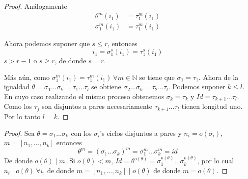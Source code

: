 \begin{proof}
    Análogamente
    \begin{equation*}
    \begin{aligned}
        \theta^m(i_1) &= \tau_1^m(i_1) \\
        \sigma_1^m(i_1) &= \tau_1^m(i_1)
    \end{aligned}
    \end{equation*}
    
    Ahora podemos suponer que $s \leq r$, entonces
    \begin{equation*}
        i_1 = \sigma_1^s(i_1) = \tau_1^s(i_1)
    \end{equation*}
    $s > r-1$ o $s \geq r$, de donde $s=r$.
    
    Más aún, como $\sigma_1^m(i_1) = \tau_1^m(i_1) \ \forall m \in \mathbb{N}$ se tiene que $\sigma_1 = \tau_1$.
    Ahora de la igualdad $\theta = \sigma_1 \dots \sigma_k = \tau_1 \dots \tau_l$ se obtiene $\sigma_2 \dots \sigma_k = \tau_2 \dots \tau_l$.
    Podemos suponer $k \leq l$. En cuyo caso realizando el mismo proceso obtenemos
    $\sigma_k = \tau_k$ y $Id = \tau_{k+1} \dots \tau_l$.
    Como los $\tau_j$ son disjuntos a pares necesariamente $\tau_{k+1} \dots \tau_l$ tienen longitud uno. Por lo tanto $l=k$.
\end{proof}


\begin{proof}
    Sea $\theta = \sigma_1 \dots \sigma_k$ con los $\sigma_i$'s ciclos disjuntos a pares y $n_i = o(\sigma_i)$, 
    $m = [n_1, \dots, n_k]$ entonces
    \begin{equation*}
        \theta^m = (\sigma_1 \dots \sigma_k)^m = \sigma_1^m \dots \sigma_k^m = id
    \end{equation*}
    De donde $o(\theta) \mid m$.
    Si $o(\theta) < m$, $Id = \theta^{o(\theta)} = \sigma_1^{o(\theta)} \dots \sigma_k^{o(\theta)}$, por lo cual $n_i \mid o(\theta) \ \forall i$, de donde $m = [n_1, \dots, n_k] \mid o(\theta)$ de donde $m = o(\theta)$.
\end{proof}


